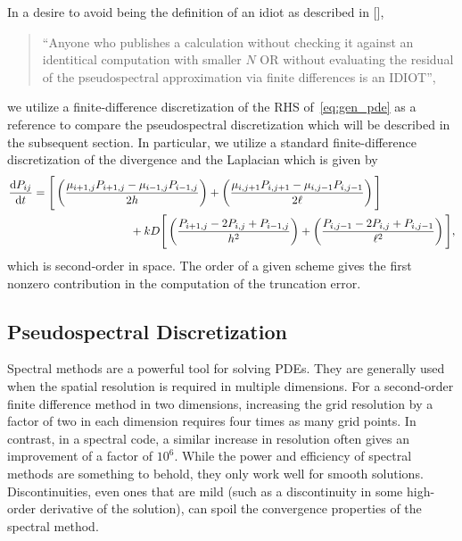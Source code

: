 \documentclass[10pt]{article}
\begin{document}
In a desire to avoid being the definition of an idiot as described in [],%
\begin{quote}
    ``Anyone who publishes a calculation without checking it against an identitical computation with smaller $N$ OR without evaluating the residual of the pseudospectral approximation via finite differences is an IDIOT'',
\end{quote}
we utilize a finite-difference discretization of the RHS of~\eqref{eq:gen_pde} as a reference to compare the pseudospectral discretization which will be described in the subsequent section. In particular, we utilize a standard finite-difference discretization of the divergence and the Laplacian which is given by
\begin{align}
    \dv{P_{ij}}{t} &= \Bigg[
    \left(\dfrac{\mu_{i+1,j}P_{i+1,j}-\mu_{i-1,j}P_{i-1,j}}{2h}\right) + \left(\dfrac{\mu_{i,j+1}P_{i,j+1}-\mu_{i,j-1}P_{i,j-1}}{2\ell}\right)
    \Bigg] \nonumber\\
    &\hspace{3cm}+ kD\Bigg[\left(\dfrac{P_{i+1,j}-2P_{i,j}+P_{i-1,j}}{h^{2}}\right) + \left(\dfrac{P_{i,j-1}-2P_{i,j}+P_{i,j-1}}{\ell^{2}}\right) \Bigg],\label{eq:central_space}
\end{align} 
which is second-order in space. The order of a given scheme gives the first nonzero contribution in the computation of the truncation error. 

\subsection{Pseudospectral Discretization}

Spectral methods are a powerful tool for solving PDEs. They are generally used when the spatial resolution is required in multiple dimensions.  For a second-order finite difference method in two dimensions, increasing the grid resolution by a factor of two in each dimension requires four times as many grid points. In contrast, in a spectral code, a similar increase in resolution often gives an improvement of a factor of $10^{6}$. While the power and efficiency of spectral methods are  something to behold, they only work well 
for smooth solutions. Discontinuities, even ones that are mild (such as a discontinuity in some high-order derivative of the solution), can spoil the convergence properties of the spectral method. 
\end{document}
